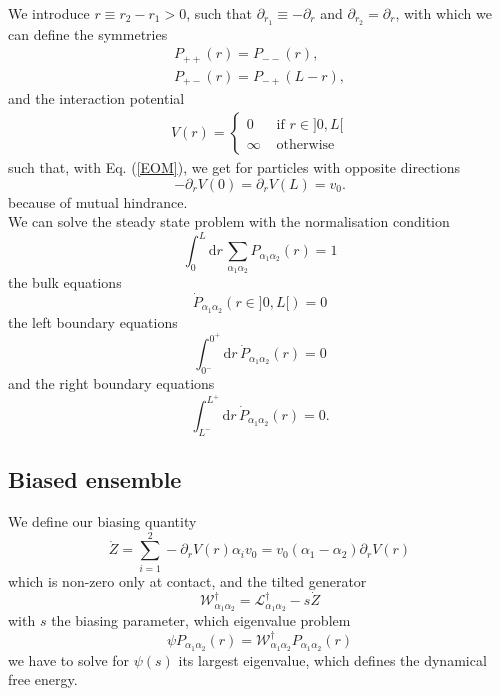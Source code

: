\documentclass[pre,aps,superscriptaddress,nofootinbib]{revtex4}
\begin{document}
We introduce $r \equiv r_2 - r_1 > 0$, such that $\partial_{r_1} \equiv - \partial_r$ and $\partial_{r_2} = \partial_r$, with which we can define the symmetries
\begin{eqnarray}
\label{evensymmetry}
P_{++}(r) = P_{--}(r),\\
\label{oddsymmetry}
P_{+-}(r) = P_{-+}(L - r),
\end{eqnarray}
and the interaction potential
\begin{align*}
V(r) = \begin{cases} 0 &\text{ if } r \in ]0, L[ \\ \infty &\text{ otherwise} \end{cases}
\end{align*}
such that, with Eq. (\ref{EOM}), we get for particles with opposite directions
\begin{equation}
- \partial_r V(0) = \partial_r V(L) = v_0.
\end{equation}
because of mutual hindrance.\\

We can solve the steady state problem with the normalisation condition
\begin{equation}
\int_0^L \mathrm{d}r \, \sum_{\alpha_1\alpha_2} P_{\alpha_1\alpha_2}(r) = 1
\label{normalisation}
\end{equation}
the bulk equations
\begin{equation}
\dot{P}_{\alpha_1\alpha_2}(r \in ]0, L[) = 0
\label{bulk}
\end{equation}
the left boundary equations
\begin{equation}
\int_{0^-}^{0^+} \mathrm{d}r \, \dot{P}_{\alpha_1\alpha_2}(r) = 0
\label{leftboundary}
\end{equation}
and the right boundary equations
\begin{equation}
\int_{L^-}^{L^+} \mathrm{d}r \, \dot{P}_{\alpha_1\alpha_2}(r) = 0.
\label{rightboundary}
\end{equation}

\subsection{Biased ensemble}

We define our biasing quantity
\begin{equation}
\dot{Z} = \sum_{i=1}^2 - \partial_r V(r) \alpha_i v_0 = v_0 (\alpha_1 - \alpha_2) \partial_r V(r)
\end{equation}
which is non-zero only at contact, and the tilted generator
\begin{equation}
\mathcal{W}^{\dagger}_{\alpha_1\alpha_2} = \mathcal{L}^{\dagger}_{\alpha_1\alpha_2} - s \dot{Z}
\end{equation}
with $s$ the biasing parameter, which eigenvalue problem
\begin{equation}
\psi P_{\alpha_1\alpha_2}(r) = \mathcal{W}^{\dagger}_{\alpha_1\alpha_2} P_{\alpha_1\alpha_2}(r)
\label{eigenproblem}
\end{equation}
we have to solve for $\psi(s)$ its largest eigenvalue, which defines the dynamical free energy.\\
\end{document}
